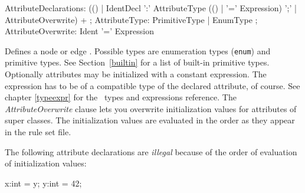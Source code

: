 \begin{rail}    
  AttributeDeclarations: (() | IdentDecl ':' AttributeType (() | '=' Expression) ';' | AttributeOverwrite) + ;
  AttributeType: PrimitiveType | EnumType ; 
  AttributeOverwrite: Ident '=' Expression
\end{rail}
Defines a node or edge . Possible types are enumeration types (\texttt{enum}) and primitive types. See Section~\ref{builtin} for a list of built-in primitive types. Optionally attributes may be initialized with a constant expression. The expression has to be of a compatible type of the declared attribute, of course. See chapter \ref{typeexpr} for the \GrG\ types and expressions reference. The \emph{AttributeOverwrite} clause lets you overwrite initialization values for attributes of super classes. The initialization values are evaluated in the order as they appear in the rule set file.
\begin{example}
	The following attribute declarations are \emph{illegal} because of the order of evaluation of initialization values:
	\begin{grgen}
x:int = y;
y:int = 42;	
	\end{grgen}
\end{example}



